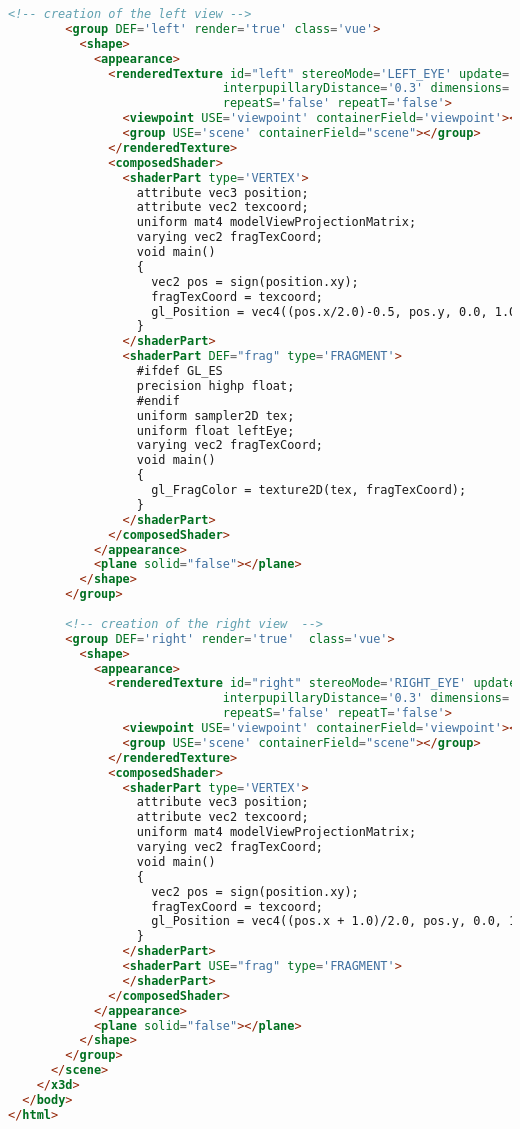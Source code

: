 \begin{lstlisting}[language=Html]
        <!-- creation of the left view -->
        <group DEF='left' render='true' class='vue'>
          <shape>
            <appearance>
              <renderedTexture id="left" stereoMode='LEFT_EYE' update='ALWAYS' 
              				  interpupillaryDistance='0.3' dimensions='800 800 4' 
              				  repeatS='false' repeatT='false'>
                <viewpoint USE='viewpoint' containerField='viewpoint'></viewpoint>
                <group USE='scene' containerField="scene"></group>
              </renderedTexture>
              <composedShader>
                <shaderPart type='VERTEX'>
                  attribute vec3 position;
                  attribute vec2 texcoord;
                  uniform mat4 modelViewProjectionMatrix;
                  varying vec2 fragTexCoord;
                  void main()
                  {
                    vec2 pos = sign(position.xy);
                    fragTexCoord = texcoord;
                    gl_Position = vec4((pos.x/2.0)-0.5, pos.y, 0.0, 1.0);
                  }
                </shaderPart>
                <shaderPart DEF="frag" type='FRAGMENT'>
                  #ifdef GL_ES
                  precision highp float;
                  #endif
                  uniform sampler2D tex;
                  uniform float leftEye;
                  varying vec2 fragTexCoord;
                  void main()
                  {
                    gl_FragColor = texture2D(tex, fragTexCoord);
                  }
                </shaderPart>
              </composedShader>
            </appearance>
            <plane solid="false"></plane>
          </shape>
        </group>
        
        <!-- creation of the right view  -->
        <group DEF='right' render='true'  class='vue'>
          <shape>
            <appearance>
              <renderedTexture id="right" stereoMode='RIGHT_EYE' update='ALWAYS' 
              				  interpupillaryDistance='0.3' dimensions='800 800 4' 
              				  repeatS='false' repeatT='false'>
                <viewpoint USE='viewpoint' containerField='viewpoint'></viewpoint>
                <group USE='scene' containerField="scene"></group>
              </renderedTexture>
              <composedShader>
                <shaderPart type='VERTEX'>
                  attribute vec3 position;
                  attribute vec2 texcoord;
                  uniform mat4 modelViewProjectionMatrix;
                  varying vec2 fragTexCoord;
                  void main()
                  {
                    vec2 pos = sign(position.xy);
                    fragTexCoord = texcoord;
                    gl_Position = vec4((pos.x + 1.0)/2.0, pos.y, 0.0, 1.0);
                  }
                </shaderPart>
                <shaderPart USE="frag" type='FRAGMENT'>
                </shaderPart>
              </composedShader>
            </appearance>
            <plane solid="false"></plane>
          </shape>
        </group>
      </scene> 
    </x3d> 
  </body>
</html>
\end{lstlisting}

